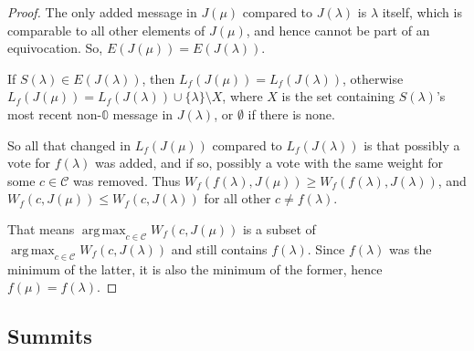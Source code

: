 \documentclass[12pt]{article}
\DeclareMathOperator*{\argmax}{arg\,max}
\begin{document}
\begin{proof}
  The only added message in $J(\mu)$ compared to $J(\lambda)$ is $\lambda$ itself, which is comparable to all other elements of $J(\mu)$, and hence cannot be part of an equivocation. So, $E(J(\mu)) = E(J(\lambda))$.

  If $S(\lambda) \in E(J(\lambda))$, then $L_f (J(\mu)) = L_f (J(\lambda))$, otherwise $L_f(J(\mu)) = L_f(J(\lambda)) \cup \{\lambda\} \setminus X$, where $X$ is the set containing $S(\lambda)$'s most recent non-$\mathbb{0}$ message in $J(\lambda)$, or $\emptyset$ if there is none.

  So all that changed in $L_f(J(\mu))$ compared to $L_f(J(\lambda))$ is that possibly a vote for $f(\lambda)$ was added, and if so, possibly a vote with the same weight for some $c\in \mathcal{C}$ was removed. Thus $W_f(f(\lambda), J(\mu)) \geq W_f(f(\lambda), J(\lambda))$, and $W_f(c, J(\mu)) \leq W_f(c, J(\lambda))$ for all other $c \neq f(\lambda)$.

  That means $\argmax_{c \in \mathcal{C}} W_f(c, J(\mu))$ is a subset of $\argmax_{c \in \mathcal{C}} W_f(c, J(\lambda))$ and still contains $f(\lambda)$. Since $f(\lambda)$ was the minimum of the latter, it is also the minimum of the former, hence $f(\mu) = f(\lambda)$.
\end{proof}


\subsection{Summits}
\end{document}
